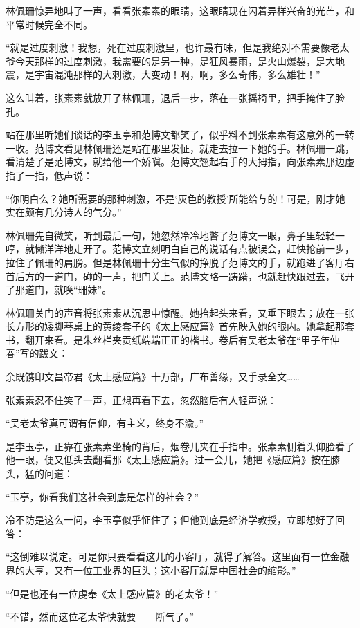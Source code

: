 \par 林佩珊惊异地叫了一声，看看张素素的眼睛，这眼睛现在闪着异样兴奋的光芒，和平常时候完全不同。
\par “就是过度刺激！我想，死在过度刺激里，也许最有味，但是我绝对不需要像老太爷今天那样的过度刺激，我需要的是另一种，是狂风暴雨，是火山爆裂，是大地震，是宇宙混沌那样的大刺激，大变动！啊，啊，多么奇伟，多么雄壮！”
\par 这么叫着，张素素就放开了林佩珊，退后一步，落在一张摇椅里，把手掩住了脸孔。
\par 站在那里听她们谈话的李玉亭和范博文都笑了，似乎料不到张素素有这意外的一转一收。范博文看见林佩珊还是站在那里发怔，就走去拉一下她的手。林佩珊一跳，看清楚了是范博文，就给他一个娇嗔。范博文翘起右手的大拇指，向张素素那边虚指了一指，低声说：
\par “你明白么？她所需要的那种刺激，不是‘灰色的教授’所能给与的！可是，刚才她实在颇有几分诗人的气分。”
\par 林佩珊先自微笑，听到最后一句，她忽然冷冷地瞥了范博文一眼，鼻子里轻轻一哼，就懒洋洋地走开了。范博文立刻明白自己的说话有点被误会，赶快抢前一步，拉住了佩珊的肩膀。但是林佩珊十分生气似的挣脱了范博文的手，就跑进了客厅右首后方的一道门，碰的一声，把门关上。范博文略一踌躇，也就赶快跟过去，飞开了那道门，就唤“珊妹”。
\par 林佩珊关门的声音将张素素从沉思中惊醒。她抬起头来看，又垂下眼去；放在一张长方形的矮脚琴桌上的黄绫套子的《太上感应篇》首先映入她的眼内。她拿起那套书，翻开来看。是朱丝栏夹贡纸端端正正的楷书。卷后有吴老太爷在“甲子年仲春”写的跋文：
\par 余既镌印文昌帝君《太上感应篇》十万部，广布善缘，又手录全文……
\par 张素素忍不住笑了一声，正想再看下去，忽然脑后有人轻声说：
\par “吴老太爷真可谓有信仰，有主义，终身不渝。”
\par 是李玉亭，正靠在张素素坐椅的背后，烟卷儿夹在手指中。张素素侧着头仰脸看了他一眼，便又低头去翻看那《太上感应篇》。过一会儿，她把《感应篇》按在膝头，猛的问道：
\par “玉亭，你看我们这社会到底是怎样的社会？”
\par 冷不防是这么一问，李玉亭似乎怔住了；但他到底是经济学教授，立即想好了回答：
\par “这倒难以说定。可是你只要看看这儿的小客厅，就得了解答。这里面有一位金融界的大亨，又有一位工业界的巨头；这小客厅就是中国社会的缩影。”
\par “但是也还有一位虔奉《太上感应篇》的老太爷！”
\par “不错，然而这位老太爷快就要——断气了。”
